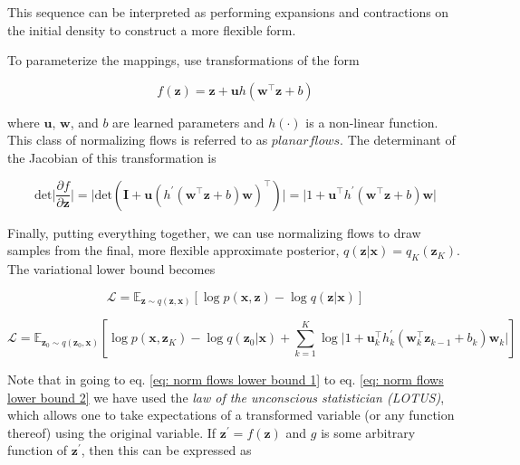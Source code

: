 \noindent This sequence can be interpreted as performing expansions and contractions on the initial density to construct a more flexible form. 

To parameterize the mappings, \cite{rezende2015variational} use transformations of the form

\begin{equation}
	f(\mathbf{z}) = \mathbf{z} + \mathbf{u}h(\mathbf{w}^\intercal \mathbf{z} + b)
	\label{eq: normalizing flows transformation}
\end{equation}

\noindent where $\mathbf{u}$, $\mathbf{w}$, and $b$ are learned parameters and $h(\cdot)$ is a non-linear function. This class of normalizing flows is referred to as $planar flows$. The determinant of the Jacobian of this transformation is

\begin{equation}
	\text{det} \bigg\vert  \frac{\partial f}{\partial \mathbf{z}} \bigg\vert = \big\vert \text{det} \left( \mathbf{I} + \mathbf{u} (h^\prime (\mathbf{w}^\intercal \mathbf{z} + b) \mathbf{w})^\intercal \right) \big\vert = \big\vert 1 + \mathbf{u}^\intercal h^\prime (\mathbf{w}^\intercal \mathbf{z} + b) \mathbf{w} \big\vert
\end{equation}

\noindent Finally, putting everything together, we can use normalizing flows to draw samples from the final, more flexible approximate posterior, $q(\mathbf{z} | \mathbf{x}) = q_K (\mathbf{z}_K)$. The variational lower bound becomes

\begin{equation}
	\mathcal{L} = \mathbb{E}_{\mathbf{z} \sim q(\mathbf{z}, \mathbf{x})} \left[ \log p(\mathbf{x}, \mathbf{z}) - \log q(\mathbf{z}|\mathbf{x}) \right]
	\label{eq: norm flows lower bound 1}
\end{equation}

\begin{equation}
	\mathcal{L} = \mathbb{E}_{\mathbf{z}_0 \sim q(\mathbf{z}_0, \mathbf{x})} \left[ \log p(\mathbf{x}, \mathbf{z}_K) - \log q(\mathbf{z}_0|\mathbf{x}) + \sum_{k=1}^K \log \big\vert 1 + \mathbf{u}_k^\intercal h_k^\prime (\mathbf{w}_k^\intercal \mathbf{z}_{k-1} + b_k) \mathbf{w}_k \big\vert \right]
	\label{eq: norm flows lower bound 2}
\end{equation}

\noindent Note that in going to eq. \ref{eq: norm flows lower bound 1} to eq. \ref{eq: norm flows lower bound 2} we have used the \textit{law of the unconscious statistician (LOTUS)}, which allows one to take expectations of a transformed variable (or any function thereof) using the original variable. If $\mathbf{z}^\prime = f(\mathbf{z})$ and $g$ is some arbitrary function of $\mathbf{z}^\prime$, then this can be expressed as

